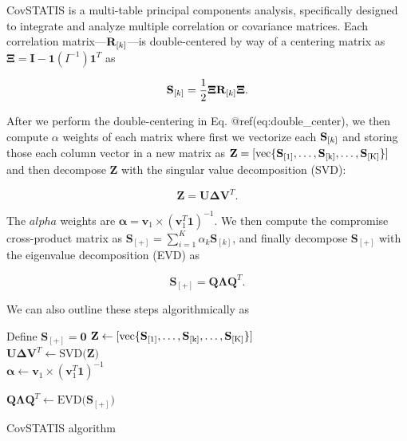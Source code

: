 \documentclass[man,floatsintext]{apa6}
\theoremstyle{definition}
\theoremstyle{definition}
\theoremstyle{definition}
\theoremstyle{remark}
\begin{document}
CovSTATIS is a multi-table principal components analysis, specifically
designed to integrate and analyze multiple correlation or covariance
matrices. Each correlation matrix---\({\bf R}_{[k]}\)---is
double-centered by way of a centering matrix as
\({\boldsymbol \Xi} = \mathbf{I} - \mathbf{1}(I^{-1})\mathbf{1}^{T}\) as

\begin{equation}
{\bf S}_{[k]} = \frac{1}{2}{\boldsymbol \Xi}{\bf R}_{[k]}{\boldsymbol \Xi}.
\label{eq:double_center}
\end{equation}

After we perform the double-centering in Eq. @ref(eq:double\_center), we
then compute \(\alpha\) weights of each matrix where first we vectorize
each \({\bf S}_{[k]}\) and storing those each column vector in a new
matrix as
\(\mathbf{Z} = [ \mathrm{vec\{ {\bf S}_{[1]}, \dots, {\bf S}_{[k]}, \dots, {\bf S}_{[K]} \}} ]\)
and then decompose \(\mathbf{Z}\) with the singular value decomposition
(SVD):

\begin{equation}
\mathbf{Z} = \mathbf{U}\boldsymbol{\Delta}\mathbf{V}^{T}.
\end{equation}

The \(alpha\) weights are
\(\boldsymbol{\alpha} = \mathbf{v}_{1} \times (\mathbf{v}_{1}^{T}\mathbf{1})^{-1}\).
We then compute the compromise cross-product matrix as
\(\mathbf{S}_{[+]} = \sum\limits_{i=1}^K \alpha_{k}\mathbf{S}_{[k]}\),
and finally decompose \(\mathbf{S}_{[+]}\) with the eigenvalue
decomposition (EVD) as

\begin{equation}
\mathbf{S}_{[+]} = \mathbf{Q}\boldsymbol{\Lambda}\mathbf{Q}^{T}.
\end{equation}

We can also outline these steps algorithmically as

\begin{algorithm}
\DontPrintSemicolon
\SetAlgoLined
{}
\Input{$[{\bf R}_{[1]} ... {\bf R}_{[k]} ... {\bf R}_{[K]}]$}
Define $\mathbf{S}_{[+]} = \mathbf{0}$
\BlankLine
{}
$\mathbf{Z} \leftarrow [ \mathrm{vec\{ {\bf S}_{[1]}, \dots, {\bf S}_{[k]}, \dots, {\bf S}_{[K]}   \}} ]$ \\
$\mathbf{U}\boldsymbol{\Delta}\mathbf{V}^{T} \leftarrow \mathrm{SVD(}\mathbf{Z}\mathrm{)}$ \\
$\boldsymbol{\alpha} \leftarrow \mathbf{v}_{1}  \times (\mathbf{v}_{1}^{T}\mathbf{1})^{-1}$ \\

$\mathbf{Q}\boldsymbol{\Lambda}\mathbf{Q}^{T} \leftarrow \mathrm{EVD(}\mathbf{S}_{[+]}\mathrm{)}$
  
  
\caption{CovSTATIS algorithm}
\label{algo:covstatis}
\end{algorithm}
\end{document}
